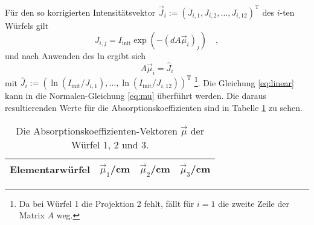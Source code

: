 Für den so korrigierten Intensitätsvektor $\vec{J}_i:=(J_{i,1},J_{i,2},\ldots,J_{i,12})^\text{T}$
des $i$-ten Würfels gilt
\begin{equation}
J_{i,j}=I_\text{init}\exp\left(- (d A \vec{\mu}_i)_j \right) \quad ,
\end{equation}
und nach Anwenden des ln ergibt sich
\begin{equation}
A \vec{\mu}_i = \hat{J}_i \label{eq:linear}
\end{equation}
mit $\hat{J}_i:=(\ln(I_\text{init}/J_{i,1}),\ldots,\ln(I_\text{init}/J_{i,12}))^\text{T}$
\footnote{
Da bei Würfel 1 die Projektion 2 fehlt, fällt für $i=1$ die zweite Zeile der Matrix $A$ weg.}.
Die Gleichung \eqref{eq:linear} kann in die Normalen-Gleichung \eqref{eq:mu}
überführt werden. Die daraus resultierenden Werte für die Absorptionskoeffizienten sind in
Tabelle \ref{tab:Koeff} zu sehen.
\begin{table}[h]
\centering
\begin{tabular}{cccc}
\toprule
\midrule
Elementarwürfel & $\vec{\mu}_1$/cm & $\vec{\mu}_2$/cm & $\vec{\mu}_3$/cm \\
\midrule

\midrule
\bottomrule
\end{tabular}
\caption{Die Absorptionskoeffizienten-Vektoren $\vec{\mu}$ der Würfel 1, 2 und 3.}
\label{tab:Koeff}
\end{table}
\clearpage
